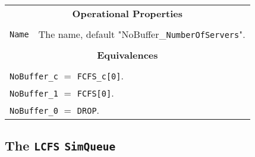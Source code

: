 \documentclass[12pt]{book}
\begin{document}
\begin{tabular}{|l|l|l|l|}
\multicolumn{4}{|c|}{\bf Operational Properties} \\
\multicolumn{4}{|c|}{} \\
\hline
\lstinline|Name| & \multicolumn{3}{|l|}{The name, default "NoBuffer\_\lstinline{NumberOfServers}".} \\
\hline
\multicolumn{4}{|c|}{} \\
\multicolumn{4}{|c|}{\bf Equivalences} \\
\multicolumn{4}{|c|}{} \\
\hline
\multicolumn{4}{|l|}{\lstinline|NoBuffer_c| $=$ \lstinline|FCFS_c[0]|.} \\
\multicolumn{4}{|l|}{\lstinline|NoBuffer_1| $=$ \lstinline|FCFS[0]|.} \\
\multicolumn{4}{|l|}{\lstinline|NoBuffer_0| $=$ \lstinline|DROP|.} \\
\hline
\end{tabular}

\subsection{The \lstinline{LCFS} \lstinline{SimQueue}}
\end{document}
